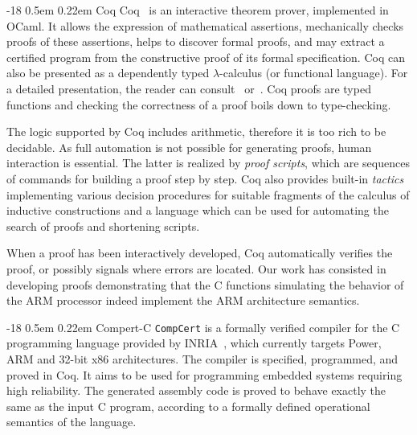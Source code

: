 \documentclass{llncs}
\makeatletter
\newcommand{\compcert}{\texttt{CompCert}\xspace}
\renewcommand\subsubsection{\@startsection{subsubsection}{3}{\z@}%
                       {-18\p@ \@plus -4\p@ \@minus -4\p@}%
                       {0.5em \@plus 0.22em}%
                       {\normalfont\normalsize\bfseries\boldmath}}
\makeatother
\begin{document}
\subsubsection{Coq}
Coq~\cite{coqart} is an interactive theorem prover, implemented in
OCaml. It allows the expression of mathematical assertions,
mechanically checks proofs of these assertions, helps to discover
formal proofs, and may extract a certified program from the
constructive proof of its formal specification.  Coq can also be
presented as a dependently typed $\lambda$-calculus (or functional
language).  For a detailed presentation, the reader can
consult~\cite{coqmanual} or~\cite{coqart}.  Coq proofs are typed
functions and checking the correctness of a proof boils down to
type-checking.

The logic supported by Coq includes arithmetic, therefore it is too
rich to be decidable.
As full automation is not
possible for generating proofs, human interaction is essential.  The
latter is realized by \emph{proof scripts}, which are sequences of
commands for building a proof step by step.  Coq also provides
built-in {\em tactics} implementing various decision procedures for
suitable fragments of the calculus of inductive constructions and a
language %
which can be used for automating the search of proofs and shortening
scripts.

When a proof has been interactively developed, Coq automatically
verifies the proof, or possibly signals where errors are located.
Our work has consisted in developing proofs demonstrating that
the C functions simulating the behavior of the ARM processor
indeed implement the ARM architecture semantics.

\subsubsection{Compert-C}
\compcert is a formally verified compiler for the C programming
language provided by INRIA~\cite{ccc,Leroy-Compcert-CACM}, which
currently targets Power, ARM and 32-bit x86 architectures.  The
compiler is specified, programmed, and proved in Coq. It aims to be
used for programming embedded systems requiring high reliability.
%
The generated assembly code is proved to behave exactly the
same as the input C program, according to a formally defined
operational semantics of the language.
\end{document}
